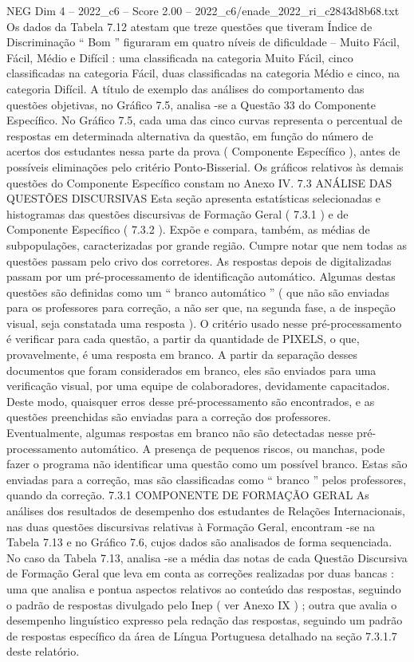 \begin{textsample}{NEG Dim 4 – 2022\_c6 – Score 2.00 – 2022\_c6/enade\_2022\_ri\_c2843d8b68.txt}
Os dados da Tabela 7.12 atestam que treze questões que tiveram Índice de Discriminação “ Bom ” figuraram em quatro níveis de dificuldade – Muito Fácil, Fácil, Médio e Difícil : uma classificada na categoria Muito Fácil, cinco classificadas na categoria Fácil, duas classificadas na categoria Médio e cinco, na categoria Difícil.
A título de exemplo das análises do comportamento das questões objetivas, no Gráfico 7.5, analisa -se a Questão 33 do Componente Específico.
No Gráfico 7.5, cada uma das cinco curvas representa o percentual de respostas em determinada alternativa da questão, em função do número de acertos dos estudantes nessa parte da prova ( Componente Específico ), antes de possíveis eliminações pelo critério Ponto-Bisserial.
Os gráficos relativos às demais questões do Componente Específico constam no Anexo IV. 7.3 ANÁLISE DAS QUESTÕES DISCURSIVAS Esta seção apresenta estatísticas selecionadas e histogramas das questões discursivas de Formação Geral ( 7.3.1 ) e de Componente Específico ( 7.3.2 ).
Expõe e compara, também, as médias de subpopulações, caracterizadas por grande região.
Cumpre notar que nem todas as questões passam pelo crivo dos corretores.
As respostas depois de digitalizadas passam por um pré-processamento de identificação automático.
Algumas destas questões são definidas como um “ branco automático ” ( que não são enviadas para os professores para correção, a não ser que, na segunda fase, a de inspeção visual, seja constatada uma resposta ).
O critério usado nesse pré-processamento é verificar para cada questão, a partir da quantidade de PIXELS, o que, provavelmente, é uma resposta em branco.
A partir da separação desses documentos que foram considerados em branco, eles são enviados para uma verificação visual, por uma equipe de colaboradores, devidamente capacitados.
Deste modo, quaisquer erros desse pré-processamento são encontrados, e as questões preenchidas são enviadas para a correção dos professores.
Eventualmente, algumas respostas em branco não são detectadas nesse pré-processamento automático.
A presença de pequenos riscos, ou manchas, pode fazer o programa não identificar uma questão como um possível branco.
Estas são enviadas para a correção, mas são classificadas como “ branco ” pelos professores, quando da correção. 7.3.1 COMPONENTE DE FORMAÇÃO GERAL As análises dos resultados de desempenho dos estudantes de Relações Internacionais, nas duas questões discursivas relativas à Formação Geral, encontram -se na Tabela 7.13 e no Gráfico 7.6, cujos dados são analisados de forma sequenciada.
No caso da Tabela 7.13, analisa -se a média das notas de cada Questão Discursiva de Formação Geral que leva em conta as correções realizadas por duas bancas : uma que analisa e pontua aspectos relativos ao conteúdo das respostas, seguindo o padrão de respostas divulgado pelo Inep ( ver Anexo IX ) ; outra que avalia o desempenho linguístico expresso pela redação das respostas, seguindo um padrão de respostas específico da área de Língua Portuguesa detalhado na seção 7.3.1.7 deste relatório.

\end{textsample}
